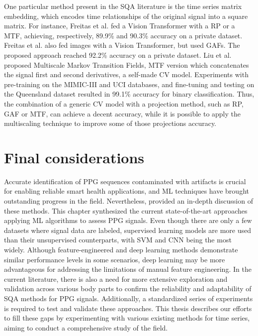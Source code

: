 

One particular method present in the \gls{SQA} literature is the time series matrix embedding, which encodes time relationships of the original signal into a square matrix. For instance, Freitas et al. \cite{imaging-4} fed a Vision Transformer with a \gls{RP} or a \gls{MTF}, achieving, respectively, 89.9\% and 90.3\% accuracy on a private dataset. Freitas et al. \cite{imaging-5} also fed images with a Vision Transformer, but used \glspl{GAF}. The proposed approach reached 92.2\% accuracy on a private dataset. Liu et al. \cite{imaging-6} proposed  Multiscale Markov Transition Fields, \gls{MTF} version which concatenates the signal first and second derivatives,  a self-made \gls{CV} model. Experiments with pre-training on the MIMIC-III and UCI databases, and fine-tuning and testing on the Queensland dataset resulted in 99.1\% accuracy for binary classification. Thus, the combination of a generic \gls{CV} model with a projection method, such as \gls{RP}, \gls{GAF} or \gls{MTF}, can achieve a decent accuracy, while it is possible to apply the multiscaling technique to improve some of those projections accuracy. 


\section{Final considerations}
\label{sec:considerations}

Accurate identification of \gls{PPG} sequences contaminated with artifacts is crucial for enabling reliable smart health applications, and \gls{ML} techniques have brought outstanding progress in the field. Nevertheless,  provided an in-depth discussion of these methods. This chapter synthesized the current state-of-the-art approaches applying \gls{ML} algorithms to assess \gls{PPG} signals. Even though there are only a few datasets where signal data are labeled, supervised learning models are more used than their unsupervised counterparts, with \gls{SVM} and \gls{CNN} being the most
widely. Although feature-engineered and deep learning methods demonstrate similar performance levels in some scenarios, deep learning may be more advantageous for addressing the limitations of manual feature engineering. In the current literature, there is also a need for more extensive exploration and validation across various body parts to confirm the reliability and adaptability of \gls{SQA} methods for \gls{PPG} signals. Additionally, a standardized series of experiments is required to test and validate these approaches. This thesis describes our efforts to fill these gaps by experimenting with various existing methods for time series, aiming to conduct a comprehensive study of the field.
